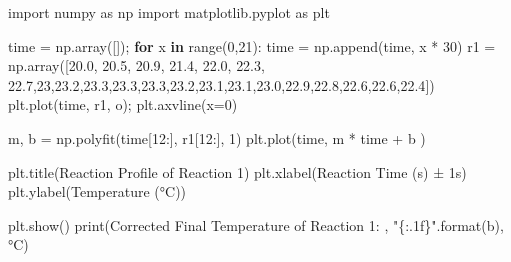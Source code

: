 \documentclass[
]{article}
\newenvironment{Shaded}{}{}
\newcommand{\BuiltInTok}[1]{#1}
\newcommand{\ControlFlowTok}[1]{\textcolor[rgb]{0.00,0.44,0.13}{\textbf{#1}}}
\newcommand{\DecValTok}[1]{\textcolor[rgb]{0.25,0.63,0.44}{#1}}
\newcommand{\FloatTok}[1]{\textcolor[rgb]{0.25,0.63,0.44}{#1}}
\newcommand{\ImportTok}[1]{#1}
\newcommand{\KeywordTok}[1]{\textcolor[rgb]{0.00,0.44,0.13}{\textbf{#1}}}
\newcommand{\NormalTok}[1]{#1}
\newcommand{\OperatorTok}[1]{\textcolor[rgb]{0.40,0.40,0.40}{#1}}
\newcommand{\SpecialCharTok}[1]{\textcolor[rgb]{0.25,0.44,0.63}{#1}}
\newcommand{\StringTok}[1]{\textcolor[rgb]{0.25,0.44,0.63}{#1}}
\begin{document}
\begin{Shaded}
\begin{Highlighting}[]
\ImportTok{import}\NormalTok{ numpy }\ImportTok{as}\NormalTok{ np}
\ImportTok{import}\NormalTok{ matplotlib.pyplot }\ImportTok{as}\NormalTok{ plt}

\NormalTok{time }\OperatorTok{=}\NormalTok{ np.array([])}\OperatorTok{;}
\ControlFlowTok{for}\NormalTok{ x }\KeywordTok{in} \BuiltInTok{range}\NormalTok{(}\DecValTok{0}\NormalTok{,}\DecValTok{21}\NormalTok{):}
\NormalTok{    time }\OperatorTok{=}\NormalTok{ np.append(time, x }\OperatorTok{*} \DecValTok{30}\NormalTok{)}
\NormalTok{r1 }\OperatorTok{=}\NormalTok{ np.array([}\FloatTok{20.0}\NormalTok{, }\FloatTok{20.5}\NormalTok{, }\FloatTok{20.9}\NormalTok{, }\FloatTok{21.4}\NormalTok{, }\FloatTok{22.0}\NormalTok{, }\FloatTok{22.3}\NormalTok{, }\FloatTok{22.7}\NormalTok{,}\DecValTok{23}\NormalTok{,}\FloatTok{23.2}\NormalTok{,}\FloatTok{23.3}\NormalTok{,}\FloatTok{23.3}\NormalTok{,}\FloatTok{23.3}\NormalTok{,}\FloatTok{23.2}\NormalTok{,}\FloatTok{23.1}\NormalTok{,}\FloatTok{23.1}\NormalTok{,}\FloatTok{23.0}\NormalTok{,}\FloatTok{22.9}\NormalTok{,}\FloatTok{22.8}\NormalTok{,}\FloatTok{22.6}\NormalTok{,}\FloatTok{22.6}\NormalTok{,}\FloatTok{22.4}\NormalTok{])}
\NormalTok{plt.plot(time, r1, }\StringTok{\textquotesingle{}o\textquotesingle{}}\NormalTok{)}\OperatorTok{;}
\NormalTok{plt.axvline(x}\OperatorTok{=}\DecValTok{0}\NormalTok{)}

\NormalTok{m, b }\OperatorTok{=}\NormalTok{ np.polyfit(time[}\DecValTok{12}\NormalTok{:], r1[}\DecValTok{12}\NormalTok{:], }\DecValTok{1}\NormalTok{)}
\NormalTok{plt.plot(time, m }\OperatorTok{*}\NormalTok{ time }\OperatorTok{+}\NormalTok{ b )}


\NormalTok{plt.title(}\StringTok{\textquotesingle{}Reaction Profile of Reaction 1\textquotesingle{}}\NormalTok{)}
\NormalTok{plt.xlabel(}\StringTok{\textquotesingle{}Reaction Time (s) ± 1s\textquotesingle{}}\NormalTok{)}
\NormalTok{plt.ylabel(}\StringTok{\textquotesingle{}Temperature (°C)\textquotesingle{}}\NormalTok{)}

\NormalTok{plt.show()}
\BuiltInTok{print}\NormalTok{(}\StringTok{\textquotesingle{}Corrected Final Temperature of Reaction 1: \textquotesingle{}}\NormalTok{, }\StringTok{"}\SpecialCharTok{\{:.1f\}}\StringTok{"}\NormalTok{.}\BuiltInTok{format}\NormalTok{(b), }\StringTok{\textquotesingle{}°C\textquotesingle{}}\NormalTok{) }
\end{Highlighting}
\end{Shaded}
\end{document}
